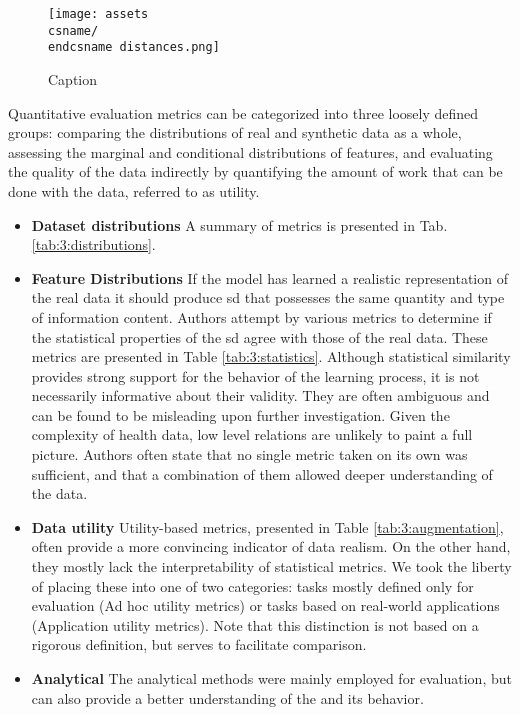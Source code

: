             \begin{figure}
                \centering
                \texttt{[image: assets\\csname/\\endcsname distances.png]}
                \caption{Caption}
                \label{fig:my_label}
            \end{figure}
            Quantitative evaluation metrics can be categorized into three loosely defined groups: comparing the distributions of real and synthetic data as a whole, assessing the marginal and conditional distributions of features, and evaluating the quality of the data indirectly by quantifying the amount of work that can be done with the data, referred to as utility.
            
            \begin{itemize}
                \item \textbf{Dataset distributions}
                A summary of metrics is presented in Tab. \ref{tab:3:distributions}.
                \item \textbf{Feature Distributions}
                If the model has learned a realistic representation of the real data it should produce \gls{sd} that possesses the same quantity and type of information content. Authors attempt by various metrics to determine if the statistical properties of the \gls{sd} agree with those of the real data. These metrics are presented in Table \ref{tab:3:statistics}. Although statistical similarity provides strong support for the behavior of the learning process, it is not necessarily informative about their validity. They are often ambiguous and can be found to be misleading upon further investigation. Given the complexity of health data, low level relations are unlikely to paint a full picture. Authors often state that no single metric taken on its own was sufficient, and that a combination of them allowed deeper understanding of the data.
                \item \textbf{Data utility}
                 Utility-based metrics, presented in Table \ref{tab:3:augmentation}, often provide a more convincing indicator of data realism. On the other hand, they mostly lack the interpretability of statistical metrics. We took the liberty of placing these into one of two categories: tasks mostly defined only for evaluation (Ad hoc utility metrics) or tasks based on real-world applications (Application utility metrics). Note that this distinction is not based on a rigorous definition, but serves to facilitate comparison.
                \item \textbf{Analytical} The analytical methods were mainly employed for evaluation, but can also provide a better understanding of the and its behavior.

\end{itemize}

